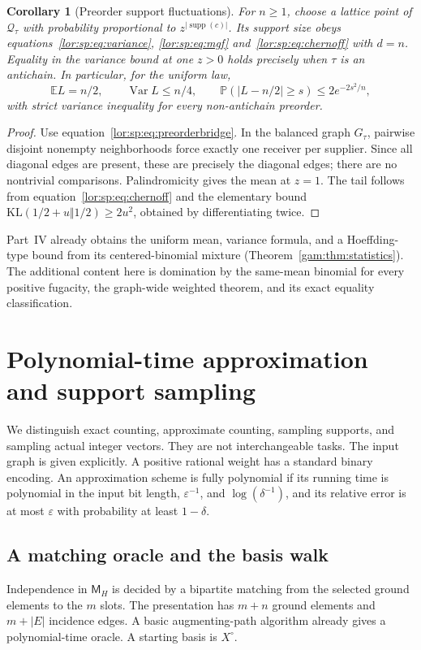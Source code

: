 \documentclass[11pt]{article}
\numberwithin{equation}{section}
\newtheorem{corollary}[theorem]{Corollary}
\theoremstyle{definition}
\newcommand{\Qt}{\mathcal Q_\tau}
\newcommand{\supp}{\operatorname{supp}}
\newcommand{\Var}{\operatorname{Var}}
\newcommand{\EE}{\mathbb E}
\newcommand{\PP}{\mathbb P}
\begin{document}
\begin{corollary}[Preorder support fluctuations]
\label{lor:sp:cor:preorderprob}
For $n\ge1$, choose a lattice point of $\Qt$ with probability proportional to
$z^{|\supp(c)|}$. Its support size obeys equations~\eqref{lor:sp:eq:variance}, \eqref{lor:sp:eq:mgf} and~\eqref{lor:sp:eq:chernoff}
with $d=n$. Equality in the variance bound at one $z>0$ holds precisely when
$\tau$ is an antichain. In particular, for the uniform law,
\[
 \EE L=n/2,\qquad \Var L\le n/4,
 \qquad
 \PP(|L-n/2|\ge s)\le2e^{-2s^2/n},
\]
with strict variance inequality for every non-antichain preorder.
\end{corollary}
\begin{proof}
Use equation~\eqref{lor:sp:eq:preorderbridge}. In the balanced graph $G_\tau$, pairwise disjoint
nonempty neighborhoods force exactly one receiver per supplier. Since all
diagonal edges are present, these are precisely the diagonal edges; there
are no nontrivial comparisons. Palindromicity gives the mean at $z=1$.
The tail follows from equation~\eqref{lor:sp:eq:chernoff} and the elementary bound
$\mathrm{KL}(1/2+u\Vert1/2)\ge2u^2$, obtained by differentiating twice.
\end{proof}

Part~IV already obtains the uniform mean, variance formula,
and a Hoeffding-type bound from its centered-binomial mixture (Theorem~\ref{gam:thm:statistics}). The additional
content here is domination by the same-mean binomial for every positive
fugacity, the graph-wide weighted theorem, and its exact equality classification.

\section{Polynomial-time approximation and support sampling}
\label{lor:sec:algorithms}
We distinguish exact counting, approximate counting, sampling supports,
and sampling actual integer vectors. They are not interchangeable tasks.
The input graph is given explicitly. A positive rational weight has a
standard binary encoding. An approximation scheme is fully polynomial if
its running time is polynomial in the input bit length, $\varepsilon^{-1}$,
and $\log(\delta^{-1})$, and its relative error is at most $\varepsilon$
with probability at least $1-\delta$.

\subsection{A matching oracle and the basis walk}
Independence in $\mathsf M_H$ is decided by a bipartite matching from the selected
ground elements to the $m$ slots. The presentation has $m+n$ ground
elements and $m+|E|$ incidence edges. A basic augmenting-path algorithm
already gives a polynomial-time oracle. A starting basis is $X^\circ$.
\end{document}
